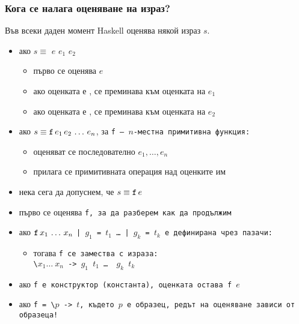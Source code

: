 \documentclass{beamer}
\begin{document}
\begin{frame}
  \frametitle{Кога се налага оценяване на израз?}

  Във всеки даден момент Haskell оценява някой израз $s$. \pause
  \begin{itemize}[<+->]
  \item ако $s \equiv$  $e$  $e_1$  $e_2$
    \begin{itemize}
    \item първо се оценява $e$
    \item ако оценката е , се преминава към оценката на $e_1$
    \item ако оценката е , се преминава към оценката на $e_2$
    \end{itemize}
  \item ако $s \equiv \tt f\,e_1\,e_2\,\ldots\,e_n$, за \tt f --- $n$-местна примитивна функция:
    \begin{itemize}
    \item оценяват се последователно $e_1,\ldots,e_n$
    \item прилага се примитивната операция над оценките им
    \end{itemize}
  \item нека сега да допуснем, че $s \equiv \tt f\,e$
  \item първо се оценява \tt f, за да разберем как да продължим
  \item ако $\tt f\,x_1\,\ldots\,x_n$ \tt| $g_1$ \tt= $t_1$ \ldots\ \tt| $g_k$ \tt= $t_k$ е дефинирана чрез пазачи:
    \begin{itemize}
    \item тогава \tt f се замества с израза:\\
      \tt{\textbackslash $x_1 \ldots\ x_n$ ->}  $g_1$  $t_1$  \ldots\  $g_k$  $t_k$ 
    \end{itemize}
  \item ако \tt f е конструктор (константа), \alert{оценката остава \tt f $e$}
  \item ако \tt{f = \textbackslash $p$ -> $t$}, където $p$ е образец, редът на оценяване зависи от образеца!
  \end{itemize}
\end{frame}
\end{document}
